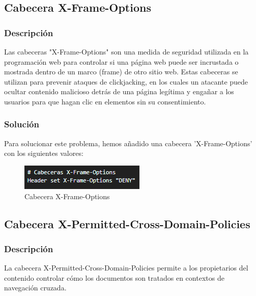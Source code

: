 \documentclass{report}
\begin{document}
            \subsection{Cabecera X-Frame-Options}
                \subsubsection{Descripción}
                    Las cabeceras "X-Frame-Options" son una medida de seguridad utilizada en la programación web para controlar si una página web puede ser incrustada o mostrada dentro de un marco (frame) de otro sitio web. Estas cabeceras se utilizan para prevenir ataques de clickjacking, en los cuales un atacante puede ocultar contenido malicioso detrás de una página legítima y engañar a los usuarios para que hagan clic en elementos sin su consentimiento.
                \subsubsection{Solución}
                    Para solucionar este problema, hemos añadido una cabecera 'X-Frame-Options' con los siguientes valores:
                    \begin{figure}[H]
                        \centering
                        \includegraphics[width=\textwidth]{./img/vulnerabilidades/3.5/7.1.png}
                        \caption{Cabecera X-Frame-Options}
                    \end{figure}
            \clearpage
            \subsection{Cabecera X-Permitted-Cross-Domain-Policies}
                \subsubsection{Descripción}
                    La cabecera X-Permitted-Cross-Domain-Policies permite a los propietarios del contenido controlar cómo los documentos son tratados en contextos de navegación cruzada.
\end{document}
